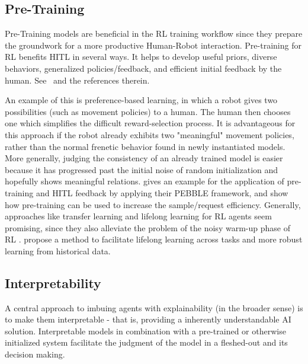 \documentclass[twoside,11pt]{article}
\begin{document}
\subsection{Pre-Training}
Pre-Training models are beneficial in the RL training workflow since they prepare the groundwork for a more productive Human-Robot interaction. Pre-training for RL benefits HITL in several ways. It helps to 
develop useful priors, diverse behaviors, generalized policies/feedback, and efficient initial feedback by the human. See~\citep{LeeSmithAbbeel:2021:FeedbackPreferenceHITLLearningPEBBLE,hazan2019provably,daniel2016hierarchical,florensa2017stochastic,eysenbach2018diversity} and the references therein.

An example of this is preference-based learning, in which a robot gives two possibilities (such as movement policies) to a human. The human then chooses one which simplifies the difficult reward-selection process. It is advantageous for this approach if the robot already exhibits two "meaningful" movement policies, rather than the normal frenetic behavior found in newly instantiated models.
More generally, judging the consistency of an already trained model is easier because it has progressed past the initial noise of random initialization and hopefully shows meaningful relations. \citet{LeeSmithAbbeel:2021:FeedbackPreferenceHITLLearningPEBBLE} gives an example for the application of pre-training and HITL feedback by applying their PEBBLE framework, and show how pre-training can be used to increase the sample/request efficiency.
Generally, approaches like transfer learning and lifelong learning for RL agents seem promising, since they also alleviate the problem of the noisy warm-up phase of RL \citep{taylor2009transfer,yang2021efficient}. \citet{AzarLazaricBrunskill:2013:LifelongLearning} propose a method to facilitate lifelong learning across tasks and more robust learning from historical data.

\subsection{Interpretability}
\label{subsec:interpretability}

A central approach to imbuing agents with explainability (in the broader sense) is to make them interpretable - that is, providing a inherently understandable AI solution. Interpretable models in combination with a pre-trained or otherwise initialized system facilitate the judgment of the model in a fleshed-out and its decision making.
\end{document}
